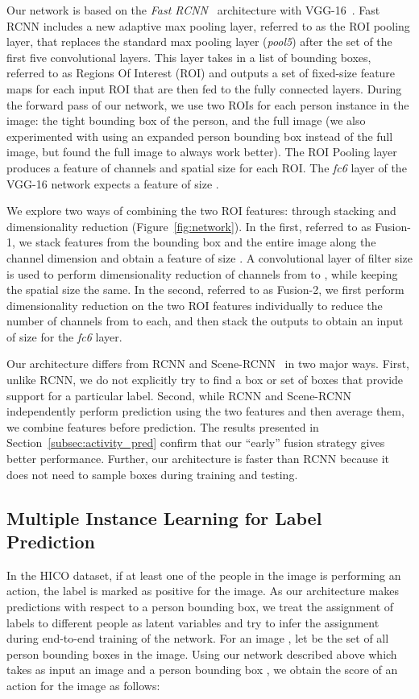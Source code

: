 \documentclass[runningheads]{llncs}
\begin{document}
Our network is based on the \emph{Fast RCNN}~\cite{girshick2015fast} architecture with VGG-16~\cite{simonyan14VGG}. Fast RCNN includes a new adaptive max pooling layer, referred to as the ROI pooling layer, that replaces the standard max pooling layer (\emph{pool5}) after the set of the first five convolutional layers. This layer takes in a list of bounding boxes, referred to as Regions Of Interest (ROI) and outputs a set of fixed-size feature maps for each input ROI that are then fed to the fully connected layers. During the forward pass of our network, we use two ROIs for each person instance in the image: the tight bounding box of the person, and the full image (we also experimented with using an expanded person bounding box instead of the full image, but found the full image to always work better). The ROI Pooling layer produces a feature of  channels and spatial size  for each ROI. 
 The \emph{fc6} layer of the VGG-16 network expects a feature of size . 
 
We explore two ways of combining the two ROI features: through stacking and dimensionality reduction (Figure~\ref{fig:network}).
In the first, referred to as Fusion-1, we stack features from the bounding box and the entire image along the channel dimension and obtain a feature of size . A convolutional layer of filter size  is used to perform dimensionality reduction of channels from  to , while keeping the spatial size the same.
In the second, referred to as Fusion-2, we first perform dimensionality reduction on the two ROI features individually to reduce the number of channels from  to  each, and then stack the outputs to obtain an input of size  for the \emph{fc6} layer.  

Our architecture differs from RCNN and Scene-RCNN~\cite{gkioxari2015rstarcnn} in two major ways. First, unlike RCNN, we do not explicitly try to find a box or set of boxes that provide support for a particular label. Second, while RCNN and Scene-RCNN independently perform prediction using the two features and then average them, we combine features before prediction. The results presented in Section~\ref{subsec:activity_pred} confirm that our ``early'' fusion strategy gives better performance. Further, our architecture is faster than RCNN because it does not need to sample boxes during training and testing.

\subsection{Multiple Instance Learning for Label Prediction}
\label{subsec:MIL}
In the HICO dataset, if at least one of the people in the image is performing an action, the label is marked as positive for the image. As our architecture makes predictions with respect to a person bounding box, we treat the assignment of labels to different people as latent variables and try to infer the assignment during end-to-end training of the network. For an image , let  be the set of all person bounding boxes in the image. Using our network described above which takes as input an image  and a person bounding box , we obtain the score of an action  for the image as follows:
\end{document}
